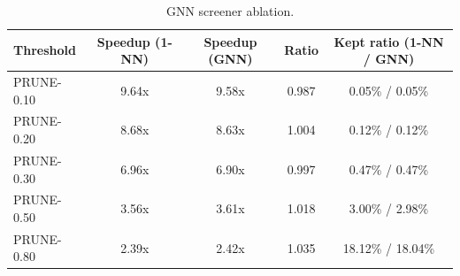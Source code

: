 \begin{table}[t]\centering
\caption{GNN screener ablation.}
\label{tab:gnn_ablation}
\small
\begin{tabular}{|l|c|c|c|c|}
\hline
\textbf{Threshold} & \textbf{Speedup (1-NN)} & \textbf{Speedup (GNN)} & \textbf{Ratio} & \textbf{Kept ratio (1-NN / GNN)} \\
\hline
PRUNE-0.10 & 9.64x & 9.58x & 0.987 & 0.05\% / 0.05\% \\
PRUNE-0.20 & 8.68x & 8.63x & 1.004 & 0.12\% / 0.12\% \\
PRUNE-0.30 & 6.96x & 6.90x & 0.997 & 0.47\% / 0.47\% \\
PRUNE-0.50 & 3.56x & 3.61x & 1.018 & 3.00\% / 2.98\% \\
PRUNE-0.80 & 2.39x & 2.42x & 1.035 & 18.12\% / 18.04\% \\
\hline
\end{tabular}
\end{table}
